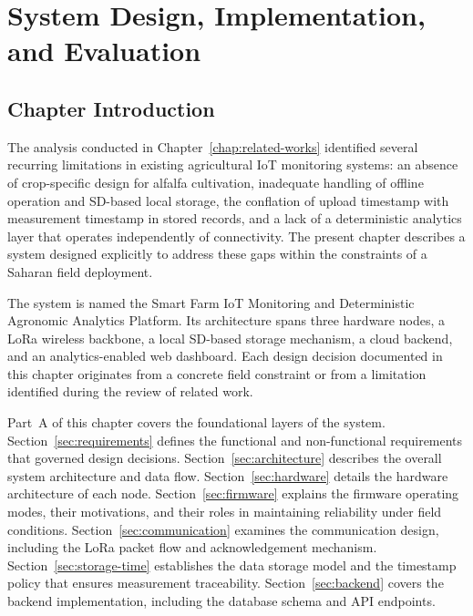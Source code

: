 
\chapter{System Design, Implementation, and Evaluation}
\label{chap:implementation}

\section{Chapter Introduction}
\label{sec:ch3-introduction}

The analysis conducted in Chapter~\ref{chap:related-works} identified several recurring limitations in existing agricultural IoT monitoring systems: an absence of crop-specific design for alfalfa cultivation, inadequate handling of offline operation and SD-based local storage, the conflation of upload timestamp with measurement timestamp in stored records, and a lack of a deterministic analytics layer that operates independently of connectivity. The present chapter describes a system designed explicitly to address these gaps within the constraints of a Saharan field deployment.

The system is named the Smart Farm IoT Monitoring and Deterministic Agronomic Analytics Platform. Its architecture spans three hardware nodes, a LoRa wireless backbone, a local SD-based storage mechanism, a cloud backend, and an analytics-enabled web dashboard. Each design decision documented in this chapter originates from a concrete field constraint or from a limitation identified during the review of related work.

Part~A of this chapter covers the foundational layers of the system. Section~\ref{sec:requirements} defines the functional and non-functional requirements that governed design decisions. Section~\ref{sec:architecture} describes the overall system architecture and data flow. Section~\ref{sec:hardware} details the hardware architecture of each node. Section~\ref{sec:firmware} explains the firmware operating modes, their motivations, and their roles in maintaining reliability under field conditions. Section~\ref{sec:communication} examines the communication design, including the LoRa packet flow and acknowledgement mechanism. Section~\ref{sec:storage-time} establishes the data storage model and the timestamp policy that ensures measurement traceability. Section~\ref{sec:backend} covers the backend implementation, including the database schema and API endpoints.

